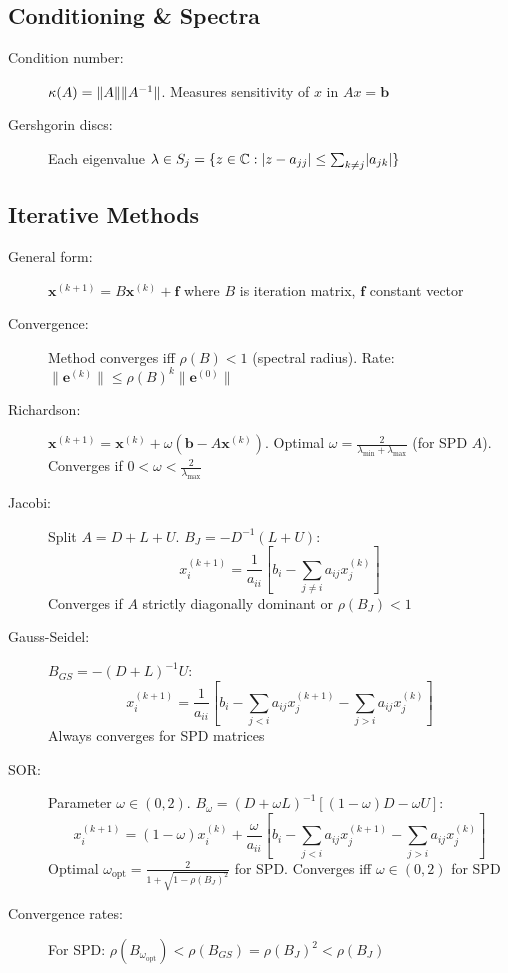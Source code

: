 \documentclass[a4paper,10pt,landscape]{article}
\DeclarePairedDelimiter{\norm}{\lVert}{\rVert}
\DeclarePairedDelimiter{\abs}{\lvert}{\rvert}
\begin{document}
\begin{multicols*}{3}
    \subsection*{Conditioning \& Spectra}
    \begin{description}
        \item[Condition number:] $\kappa(A) = \norm{A}\norm{A^{-1}}$. Measures sensitivity of $x$ in $Ax=\mathbf{b}$
        \item[Gershgorin discs:] Each eigenvalue $\lambda \in S_j = \{z \in \mathbb{C}: \abs{z-a_{jj}} \leq \sum_{k\neq j}\abs{a_{jk}}\}$
    \end{description}

    \subsection*{Iterative Methods}
    \begin{description}
        \item[General form:] $\mathbf{x}^{(k+1)} = B\mathbf{x}^{(k)} + \mathbf{f}$ where $B$ is iteration matrix, $\mathbf{f}$ constant vector
        \item[Convergence:] Method converges iff $\rho(B) < 1$ (spectral radius). Rate: $\|\mathbf{e}^{(k)}\| \leq \rho(B)^k \|\mathbf{e}^{(0)}\|$
        \item[Richardson:] $\mathbf{x}^{(k+1)} = \mathbf{x}^{(k)} + \omega(\mathbf{b} - A\mathbf{x}^{(k)})$. Optimal $\omega = \frac{2}{\lambda_{\min} + \lambda_{\max}}$ (for SPD $A$). Converges if $0 < \omega < \frac{2}{\lambda_{\max}}$
        \item[Jacobi:] Split $A = D + L + U$. $B_J = -D^{-1}(L+U)$:
              $$x_i^{(k+1)} = \frac{1}{a_{ii}}\left[b_i - \sum_{j \neq i}a_{ij}x_j^{(k)}\right]$$
              Converges if $A$ strictly diagonally dominant or $\rho(B_J) < 1$
        \item[Gauss-Seidel:] $B_{GS} = -(D+L)^{-1}U$:
              $$x_i^{(k+1)} = \frac{1}{a_{ii}}\left[b_i - \sum_{j<i}a_{ij}x_j^{(k+1)} - \sum_{j>i}a_{ij}x_j^{(k)}\right]$$
              Always converges for SPD matrices
        \item[SOR:] Parameter $\omega \in (0,2)$. $B_{\omega} = (D+\omega L)^{-1}[(1-\omega)D - \omega U]$:
              $$x_i^{(k+1)} = (1-\omega)x_i^{(k)} + \frac{\omega}{a_{ii}}\left[b_i - \sum_{j<i}a_{ij}x_j^{(k+1)} - \sum_{j>i}a_{ij}x_j^{(k)}\right]$$
              Optimal $\omega_{\text{opt}} = \frac{2}{1+\sqrt{1-\rho(B_J)^2}}$ for SPD. Converges iff $\omega \in (0,2)$ for SPD
        \item[Convergence rates:] For SPD: $\rho(B_{\omega_{\text{opt}}}) < \rho(B_{GS}) = \rho(B_J)^2 < \rho(B_J)$
    \end{description}


\end{multicols*}
\end{document}
